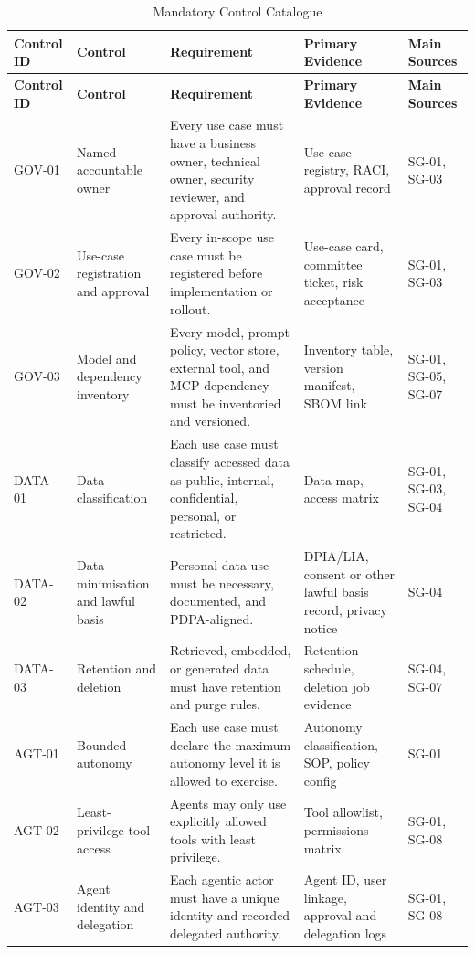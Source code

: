 \documentclass[11pt,a4paper]{article}
\begin{document}
\begin{longtable}{P{0.10\textwidth}P{0.21\textwidth}P{0.23\textwidth}P{0.18\textwidth}P{0.18\textwidth}}
\caption{Mandatory Control Catalogue} \\
\toprule
\textbf{Control ID} & \textbf{Control} & \textbf{Requirement} & \textbf{Primary Evidence} & \textbf{Main Sources} \\
\midrule
\endfirsthead
\toprule
\textbf{Control ID} & \textbf{Control} & \textbf{Requirement} & \textbf{Primary Evidence} & \textbf{Main Sources} \\
\midrule
\endhead
GOV-01 & Named accountable owner & Every use case must have a business owner, technical owner, security reviewer, and approval authority. & Use-case registry, RACI, approval record & SG-01, SG-03 \\
GOV-02 & Use-case registration and approval & Every in-scope use case must be registered before implementation or rollout. & Use-case card, committee ticket, risk acceptance & SG-01, SG-03 \\
GOV-03 & Model and dependency inventory & Every model, prompt policy, vector store, external tool, and MCP dependency must be inventoried and versioned. & Inventory table, version manifest, SBOM link & SG-01, SG-05, SG-07 \\
DATA-01 & Data classification & Each use case must classify accessed data as public, internal, confidential, personal, or restricted. & Data map, access matrix & SG-01, SG-03, SG-04 \\
DATA-02 & Data minimisation and lawful basis & Personal-data use must be necessary, documented, and PDPA-aligned. & DPIA/LIA, consent or other lawful basis record, privacy notice & SG-04 \\
DATA-03 & Retention and deletion & Retrieved, embedded, or generated data must have retention and purge rules. & Retention schedule, deletion job evidence & SG-04, SG-07 \\
AGT-01 & Bounded autonomy & Each use case must declare the maximum autonomy level it is allowed to exercise. & Autonomy classification, SOP, policy config & SG-01 \\
AGT-02 & Least-privilege tool access & Agents may only use explicitly allowed tools with least privilege. & Tool allowlist, permissions matrix & SG-01, SG-08 \\
AGT-03 & Agent identity and delegation & Each agentic actor must have a unique identity and recorded delegated authority. & Agent ID, user linkage, approval and delegation logs & SG-01, SG-08 \\

\end{longtable}
\end{document}
